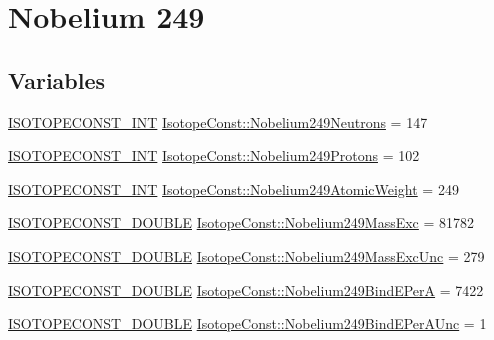 \hypertarget{group___isotope_const-_nobelium-_no249}{}\section{Nobelium 249}
\label{group___isotope_const-_nobelium-_no249}
\subsection*{Variables}
\begin{DoxyCompactItemize}
\item 
\mbox{\hyperlink{group___isotope_const-_macros_ga5f18360b3e99483a35c32d789e62621c}{I\+S\+O\+T\+O\+P\+E\+C\+O\+N\+S\+T\+\_\+\+I\+NT}} \mbox{\hyperlink{group___isotope_const-_nobelium-_no249_gab2d030a382c7ef1183c1516e6aec50c5}{Isotope\+Const\+::\+Nobelium249\+Neutrons}} = 147
\item 
\mbox{\hyperlink{group___isotope_const-_macros_ga5f18360b3e99483a35c32d789e62621c}{I\+S\+O\+T\+O\+P\+E\+C\+O\+N\+S\+T\+\_\+\+I\+NT}} \mbox{\hyperlink{group___isotope_const-_nobelium-_no249_gae600bfaeb7d6270980352a3dbff9e8c9}{Isotope\+Const\+::\+Nobelium249\+Protons}} = 102
\item 
\mbox{\hyperlink{group___isotope_const-_macros_ga5f18360b3e99483a35c32d789e62621c}{I\+S\+O\+T\+O\+P\+E\+C\+O\+N\+S\+T\+\_\+\+I\+NT}} \mbox{\hyperlink{group___isotope_const-_nobelium-_no249_ga2463b937078e512756c5058b976fa5a8}{Isotope\+Const\+::\+Nobelium249\+Atomic\+Weight}} = 249
\item 
\mbox{\hyperlink{group___isotope_const-_macros_ga8f45a7272ce02c0b4c65c44636ed719a}{I\+S\+O\+T\+O\+P\+E\+C\+O\+N\+S\+T\+\_\+\+D\+O\+U\+B\+LE}} \mbox{\hyperlink{group___isotope_const-_nobelium-_no249_ga7205381e2a024197937b3f4cdc184032}{Isotope\+Const\+::\+Nobelium249\+Mass\+Exc}} = 81782
\item 
\mbox{\hyperlink{group___isotope_const-_macros_ga8f45a7272ce02c0b4c65c44636ed719a}{I\+S\+O\+T\+O\+P\+E\+C\+O\+N\+S\+T\+\_\+\+D\+O\+U\+B\+LE}} \mbox{\hyperlink{group___isotope_const-_nobelium-_no249_gadda7833e7fc95f3b3a88d9b1829ee63f}{Isotope\+Const\+::\+Nobelium249\+Mass\+Exc\+Unc}} = 279
\item 
\mbox{\hyperlink{group___isotope_const-_macros_ga8f45a7272ce02c0b4c65c44636ed719a}{I\+S\+O\+T\+O\+P\+E\+C\+O\+N\+S\+T\+\_\+\+D\+O\+U\+B\+LE}} \mbox{\hyperlink{group___isotope_const-_nobelium-_no249_gacd4d3afe449e14591bd09fa6b8b547c8}{Isotope\+Const\+::\+Nobelium249\+Bind\+E\+PerA}} = 7422
\item 
\mbox{\hyperlink{group___isotope_const-_macros_ga8f45a7272ce02c0b4c65c44636ed719a}{I\+S\+O\+T\+O\+P\+E\+C\+O\+N\+S\+T\+\_\+\+D\+O\+U\+B\+LE}} \mbox{\hyperlink{group___isotope_const-_nobelium-_no249_ga1beb2a1e6a0926cad88430f60eabf2e6}{Isotope\+Const\+::\+Nobelium249\+Bind\+E\+Per\+A\+Unc}} = 1

\end{DoxyCompactItemize}
